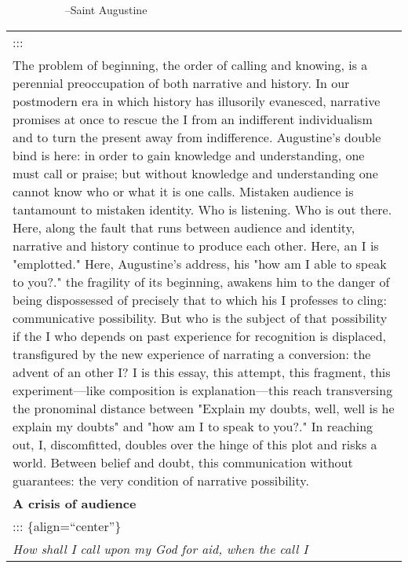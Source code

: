 ~~~~~~~~~~ --Saint Augustine

\begin{longtable}[]{@{}l@{}}
\toprule
\endhead
\begin{minipage}[t]{0.97\columnwidth}\raggedright
:::\strut
\end{minipage}\tabularnewline
\begin{minipage}[t]{0.97\columnwidth}\raggedright
The problem of beginning, the order of calling and knowing, is a
perennial preoccupation of both narrative and history. In our postmodern
era in which history has illusorily evanesced, narrative promises at
once to rescue the I from an indifferent individualism and to turn the
present away from indifference. Augustine's double bind is here: in
order to gain knowledge and understanding, one must call or praise; but
without knowledge and understanding one cannot know who or what it is
one calls. Mistaken audience is tantamount to mistaken identity. Who is
listening. Who is out there. Here, along the fault that runs between
audience and identity, narrative and history continue to produce each
other. Here, an I is "emplotted." Here, Augustine's address, his "how am
I able to speak to you?." the fragility of its beginning, awakens him to
the danger of being dispossessed of precisely that to which his I
professes to cling: communicative possibility. But who is the subject of
that possibility if the I who depends on past experience for recognition
is displaced, transfigured by the new experience of narrating a
conversion: the advent of an other I? I is this essay, this attempt,
this fragment, this experiment---like composition is explanation---this
reach transversing the pronominal distance between "Explain my doubts,
well, well is he explain my doubts" and "how am I to speak to you?." In
reaching out, I, discomfitted, doubles over the hinge of this plot and
risks a world. Between belief and doubt, this communication without
guarantees: the very condition of narrative possibility.\strut
\end{minipage}\tabularnewline
\begin{minipage}[t]{0.97\columnwidth}\raggedright
\textbf{A crisis of audience}\strut
\end{minipage}\tabularnewline
\begin{minipage}[t]{0.97\columnwidth}\raggedright
::: \{align=``center''\}\strut
\end{minipage}\tabularnewline
\begin{minipage}[t]{0.97\columnwidth}\raggedright
\textbar{} \emph{How shall I call upon my God for aid, when the call I
}
\end{minipage}
\end{longtable}
